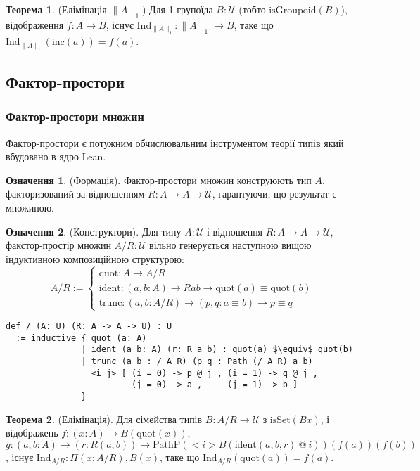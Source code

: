 \documentclass{article}
\theoremstyle{definition}
\newtheorem{theorem}{Теорема}
\newtheorem{definition}{Означення}
\begin{document}
\begin{theorem} (Елімінація \( \| A \|_1 \))
Для 1-групоїда \( B : \mathcal{U} \) (тобто \( \text{isGroupoid}(B) \)),
відображення \( f : A \to B \), існує \( \text{Ind}_{\|A\|_1} : \|A\|_1 \to B \),
таке що \( \text{Ind}_{\|A\|_1}(\text{inc}(a)) = f(a) \).
\end{theorem}

\newpage
\subsection{Фактор-простори}
\subsubsection*{Фактор-простори множин}
Фактор-простори є потужним обчислювальним інструментом теорії типів який
вбудовано в ядро Lean.
\begin{definition} (Формація).
Фактор-простори множин конструюють тип \( A \), факторизований за
відношенням \( R : A \to A \to \mathcal{U} \), гарантуючи, що результат є множиною.
\end{definition}

\begin{definition} (Конструктори).
Для типу \( A : \mathcal{U} \) і відношення \( R : A \to A \to \mathcal{U} \),
факстор-простір множин \( A / R : \mathcal{U} \) вільно генерується наступною
вищою індуктивною композиційною структурою:
\[
A / R :=
\begin{cases}
\text{quot} : A \to A / R \\
\text{ident} : (a, b : A) \to R a b \to \text{quot}(a) \equiv \text{quot}(b) \\
\text{trunc} : (a, b : A / R) \to (p, q : a \equiv b) \to p \equiv q
\end{cases}
\]
\begin{lstlisting}[mathescape=true]
def / (A: U) (R: A -> A -> U) : U
  := inductive { quot (a: A)
               | ident (a b: A) (r: R a b) : quot(a) $\equiv$ quot(b)
               | trunc (a b : / A R) (p q : Path (/ A R) a b)
                 <i j> [ (i = 0) -> p @ j , (i = 1) -> q @ j ,
                         (j = 0) -> a ,     (j = 1) -> b ]
               }
\end{lstlisting}
\end{definition}

\begin{theorem} (Елімінація).
Для сімейства типів \( B : A/R \to \mathcal{U} \) з \( \text{isSet}(B x) \),
і відображень \( f : (x : A) \to B(\text{quot}(x)) \),
\( g : (a, b : A) \to (r : R(a,b)) \to \text{PathP} (<i> B(\text{ident}(a,b,r)\ @\ i)) (f(a)) (f(b)) \),
існує \( \text{Ind}_{A/R} : \Pi (x: A/R), B(x) \), таке що \( \text{Ind}_{A/R}(\text{quot}(a)) = f(a) \).
\end{theorem}
\end{document}

